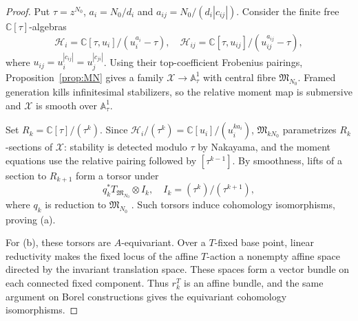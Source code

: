 \documentclass[11pt,reqno]{amsart}
\theoremstyle{definition}
\theoremstyle{remark}
\def\bbC{\mathbb C}
\begin{document}
\begin{proof}
Put $\tau=z^{N_0}$, $a_i=N_0/d_i$ and
$a_{ij}=N_0/(d_i|c_{ij}|)$. Consider the finite free
$\bbC[\tau]$-algebras
\[
 \mathcal H_i=\bbC[\tau,u_i]/(u_i^{a_i}-\tau),\quad
 \mathcal H_{ij}=\bbC[\tau,u_{ij}]/(u_{ij}^{a_{ij}}-\tau),
\]
where $u_{ij}=u_i^{|c_{ij}|}=u_j^{|c_{ji}|}$.
Using their top-coefficient Frobenius pairings, Proposition~\ref{prop:MN}
gives a family $\mathcal X\to\mathbb A^1_\tau$ with central fibre
$\mathfrak M_{N_0}$. Framed generation kills infinitesimal
stabilizers, so the relative moment map is submersive and
$\mathcal X$ is smooth over $\mathbb A^1_\tau$.

Set $R_k=\bbC[\tau]/(\tau^k)$. Since
$\mathcal H_i/(\tau^k)=\bbC[u_i]/(u_i^{ka_i})$,
$\mathfrak M_{kN_0}$ parametrizes $R_k$-sections of $\mathcal X$:
stability is detected modulo $\tau$ by Nakayama, and the moment
equations use the relative pairing followed by $[\tau^{k-1}]$.
By smoothness, lifts of a section to $R_{k+1}$ form a torsor under
\[
 q_k^*T_{\mathfrak M_{N_0}}\otimes I_k,
 \quad I_k=(\tau^k)/(\tau^{k+1}),
\]
where $q_k$ is reduction to $\mathfrak M_{N_0}$
\cite[Tag~02GZ]{Stacks}. Such torsors induce cohomology
isomorphisms, proving (a).

For (b), these torsors are $A$-equivariant. Over a $T$-fixed
base point, linear reductivity makes the fixed locus of the
affine $T$-action a nonempty affine space directed by the
invariant translation space. These spaces form a vector bundle
on each connected fixed component. Thus $r_k^T$ is an affine
bundle, and the same argument on Borel constructions gives
the equivariant cohomology isomorphisms.
\end{proof}
\end{document}
